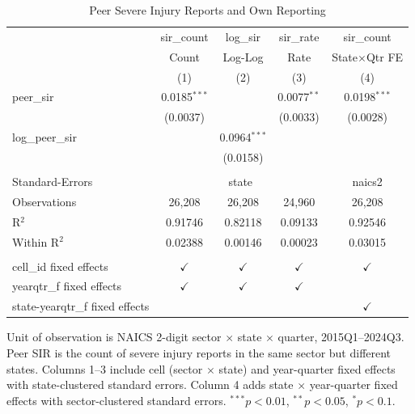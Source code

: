 
\begin{table}[htbp]
   \caption{\label{tab:ols} Peer Severe Injury Reports and Own Reporting}
   \bigskip
   \centering
   \begin{tabular}{lcccc}
      \toprule
                                      & sir\_count     & log\_sir       & sir\_rate     & sir\_count\\   
                                      & Count          & Log-Log        & Rate          & State$\times$Qtr FE \\    
                                      & (1)            & (2)            & (3)           & (4)\\  
      \midrule 
      peer\_sir                       & 0.0185$^{***}$ &                & 0.0077$^{**}$ & 0.0198$^{***}$\\   
                                      & (0.0037)       &                & (0.0033)      & (0.0028)\\   
      log\_peer\_sir                  &                & 0.0964$^{***}$ &               &   \\   
                                      &                & (0.0158)       &               &   \\   
       \\
      Standard-Errors & \multicolumn{3}{c}{state} & naics2 \\ 
      Observations                    & 26,208         & 26,208         & 24,960        & 26,208\\  
      R$^2$                           & 0.91746        & 0.82118        & 0.09133       & 0.92546\\  
      Within R$^2$                    & 0.02388        & 0.00146        & 0.00023       & 0.03015\\  
       \\
      cell\_id fixed effects          & $\checkmark$   & $\checkmark$   & $\checkmark$  & $\checkmark$\\   
      yearqtr\_f fixed effects        & $\checkmark$   & $\checkmark$   & $\checkmark$  & \\  
      state-yearqtr\_f fixed effects  &                &                &               & $\checkmark$\\   
      \bottomrule
   \end{tabular}
   
   \par \raggedright 
   Unit of observation is NAICS 2-digit sector $\times$ state $\times$ quarter, 2015Q1--2024Q3. Peer SIR is the count of severe injury reports in the same sector but different states. Columns 1--3 include cell (sector $\times$ state) and year-quarter fixed effects with state-clustered standard errors. Column 4 adds state $\times$ year-quarter fixed effects with sector-clustered standard errors. $^{***}p<0.01$, $^{**}p<0.05$, $^{*}p<0.1$.
\end{table}


